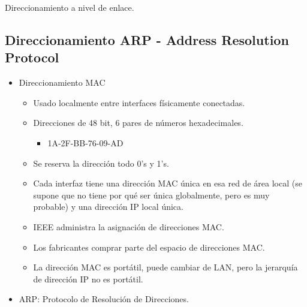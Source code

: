\documentclass[12pt, twoside, openright]{report} %
\begin{document}
    Direccionamiento a nivel de enlace.

\subsection{Direccionamiento ARP - Address Resolution Protocol}

      \begin{itemize}
      \item
        Direccionamiento MAC

        \begin{itemize}
        \item
          Usado localmente entre interfaces físicamente conectadas.
        \item
          Direcciones de 48 bit, 6 pares de números hexadecimales.

          \begin{itemize}
          \item
            1A-2F-BB-76-09-AD
          \end{itemize}
        \item
          Se reserva la dirección todo 0's y 1's.
        \item
          Cada interfaz tiene una dirección MAC única en esa red de área
          local (se supone que no tiene por qué ser única globalmente,
          pero es muy probable) y una dirección IP local única.
        \item
          IEEE administra la asignación de direcciones MAC.
        \item
          Los fabricantes comprar parte del espacio de direcciones MAC.
        \item
          La dirección MAC es portátil, puede cambiar de LAN, pero la
          jerarquía de dirección IP no es portátil.
        \end{itemize}
      \item
        ARP: Protocolo de Resolución de Direcciones.


\end{itemize}
\end{document}
